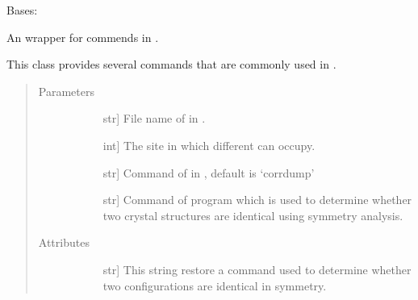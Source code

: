 \documentclass[letterpaper,10pt,english]{sphinxmanual}
\begin{document}
\begin{fulllineitems}
\label{\detokenize{pygace:pygace.ce.CE}}
\sphinxAtStartPar
Bases: 

\sphinxAtStartPar
An wrapper for commends in .

\sphinxAtStartPar
This class provides several commands that are commonly used in .
\begin{quote}\begin{description}
\item[{Parameters}] \leavevmode\begin{description}
\item[{}] \leavevmode{[}str{]}
\sphinxAtStartPar
File name of  in .

\item[{}] \leavevmode{[}int{]}
\sphinxAtStartPar
The site in which different can occupy.

\item[{}] \leavevmode{[}str{]}
\sphinxAtStartPar
Command of  in , default is ‘corrdump’

\item[{}] \leavevmode{[}str{]}
\sphinxAtStartPar
Command of program which is used to determine whether two crystal
structures are identical using symmetry analysis.

\end{description}

\item[{Attributes}] \leavevmode\begin{description}
\item[{}] \leavevmode{[}str{]}
\sphinxAtStartPar
This string restore a command used to determine whether two
configurations are identical in symmetry.


\end{description}
\end{description}
\end{quote}
\end{fulllineitems}
\end{document}
